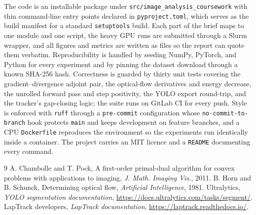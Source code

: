 \documentclass[11pt,a4paper]{article}
\begin{document}
The code is an installable package under \texttt{src/image\_analysis\_coursework}
with thin command-line entry points declared in \texttt{pyproject.toml}, which
serves as the build manifest for a standard \texttt{setuptools} build. Each part
of the brief maps to one module and one script, the heavy GPU runs are submitted
through a Slurm wrapper, and all figures and metrics are written as files so the
report can quote them verbatim. Reproducibility is handled by seeding NumPy,
PyTorch, and Python for every experiment and by pinning the dataset download
through a known SHA-256 hash. Correctness is guarded by thirty unit tests
covering the gradient--divergence adjoint pair, the optical-flow derivatives and
energy decrease, the unrolled forward pass and step positivity, the YOLO export
round-trip, and the tracker's gap-closing logic; the suite runs on GitLab CI for
every push. Style is enforced with \texttt{ruff} through a \texttt{pre-commit}
configuration whose \texttt{no-commit-to-branch} hook protects \texttt{main} and
keeps development on feature branches, and a CPU \texttt{Dockerfile} reproduces
the environment so the experiments run identically inside a container. The
project carries an MIT licence and a \texttt{README} documenting every command.

\begin{thebibliography}{9}
A. Chambolle and T. Pock, A first-order primal-dual algorithm for convex
problems with applications to imaging, \emph{J. Math. Imaging Vis.}, 2011.
B. Horn and B. Schunck, Determining optical flow, \emph{Artificial
Intelligence}, 1981.
Ultralytics, \emph{YOLO segmentation documentation},
\url{https://docs.ultralytics.com/tasks/segment/}.
LapTrack developers, \emph{LapTrack documentation},
\url{https://laptrack.readthedocs.io/}.
\end{thebibliography}
\end{document}
